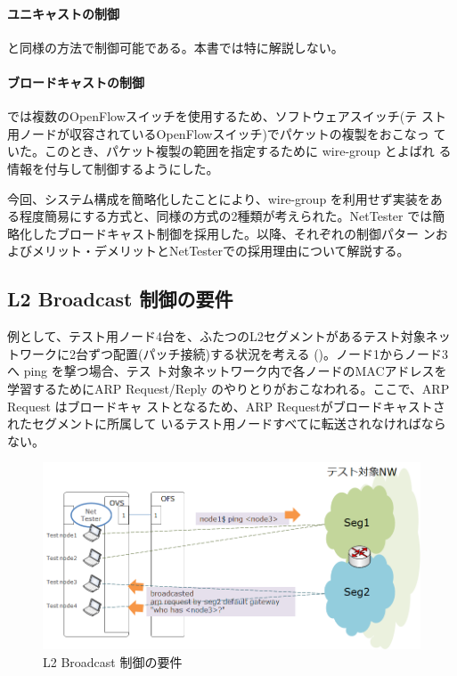     \paragraph{ユニキャストの制御}

\lopj と同様の方法で制御可能である。本書では特に解説しない。

    \paragraph{ブロードキャストの制御}

\lopj では複数のOpenFlowスイッチを使用するため、ソフトウェアスイッチ(テ
スト用ノードが収容されているOpenFlowスイッチ)でパケットの複製をおこなっ
ていた。このとき、パケット複製の範囲を指定するために wire-group とよばれ
る情報を付与して制御するようにした。

今回、システム構成を簡略化したことにより、wire-group を利用せず実装をあ
る程度簡易にする方式と、\lopj 同様の方式の2種類が考えられた。NetTester
では簡略化したブロードキャスト制御を採用した。以降、それぞれの制御パター
ンおよびメリット・デメリットとNetTesterでの採用理由について解説する。

  \subsection{L2 Broadcast 制御の要件}
  \label{sec:l2bcctrl-requirement}

例として、テスト用ノード4台を、ふたつのL2セグメントがあるテスト対象ネッ
トワークに2台ずつ配置(パッチ接続)する状況を考える
()。ノード1からノード3へ ping を撃つ場合、テス
ト対象ネットワーク内で各ノードのMACアドレスを学習するためにARP
Request/Reply のやりとりがおこなわれる。ここで、ARP Request はブロードキャ
ストとなるため、ARP Requestがブロードキャストされたセグメントに所属して
いるテスト用ノードすべてに転送されなければならない。

\begin{figure}[h]
 \centering
 \includegraphics[scale=0.6]{img/l2bcctrl_req1.png}
 \caption{L2 Broadcast 制御の要件}
 \label{fig:l2bcctrl_req1}
\end{figure}

